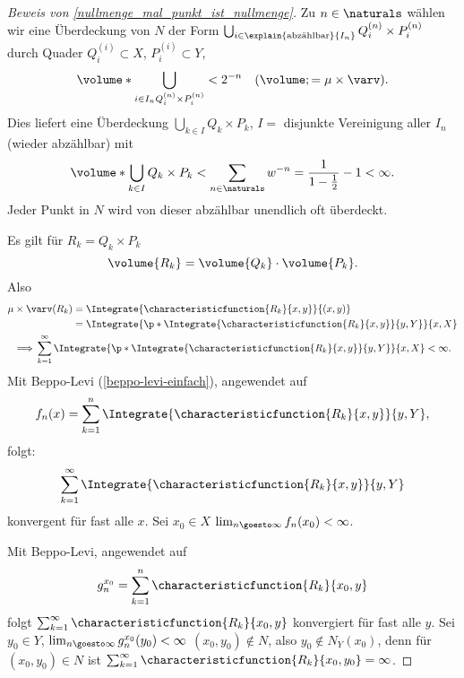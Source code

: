 \begin{proof}[Beweis von \ref{nullmenge_mal_punkt_ist_nullmenge}]
  Zu \( n\in \naturals \) wählen wir eine Überdeckung von \( N \) der Form \( \bigcup_{i\in \explain{\text{abzählbar}}{I_n}}Q_i^{(n)}\times P_i^{(n)} \) durch Quader \( Q_i^{(i)}\subset X \), \( P_i^{(i)}\subset Y \),
  \begin{equation*}
    \volume*{\bigcup_{i\in I_n Q_i^{(n)}\times P_i^{(n)}}}<2^{-n}\quad (\volume;=\mu\times \varv).
  \end{equation*}
  Dies liefert eine Überdeckung \( \bigcup_{k\in I}Q_k\times P_k \), \( I =  \) disjunkte Vereinigung aller \( I_n \) (wieder abzählbar) mit 
  \begin{equation*}
    \volume*{\bigcup_{k\in I}Q_k\times P_k}<\sum_{n\in \naturals} w^{-n}=\frac{1}{1-\frac{1}{2}}-1<\infty.
  \end{equation*}
  Jeder Punkt in \( N \) wird von dieser abzählbar unendlich oft überdeckt.

  Es gilt für \( R_k=Q_k\times P_k \)
  \begin{equation*}
    \volume{R_k}=\volume{Q_k}\cdot \volume{P_k}.
  \end{equation*}
  Also
  \begin{align*}
    \mu\times \varv(R_k)&=\Integrate{\characteristicfunction{R_k}{x,y}}{{(x,y)}}\\
    &=\Integrate{\p*{\Integrate{\characteristicfunction{R_k}{x,y}}{y,Y}}}{x,X}\\
    \implies \span \sum_{k=1}^{\infty}\Integrate{\p*{\Integrate{\characteristicfunction{R_k}{x,y}}{y,Y}}}{x,X}<\infty.
  \end{align*}
  Mit Beppo-Levi (\ref{beppo-levi-einfach}), angewendet auf
  \begin{equation*}
    f_n(x)=\sum_{k=1}^{n}\Integrate{\characteristicfunction{R_k}{x,y}}{y,Y},
  \end{equation*}
  folgt:
  \begin{equation}
    \sum_{k=1}^{\infty}\Integrate{\characteristicfunction{R_k}{x,y}}{y,Y} 
  \end{equation}
  konvergent für fast alle \( x \). Sei \( x_0\in X \) \sd \( \lim_{n \goesto \infty}f_n(x_0)<\infty \).

  Mit Beppo-Levi, angewendet auf
  \begin{equation*}
    g_n^{x_0}=\sum_{k=1}^{n}\characteristicfunction{R_k}{x_0,y}
  \end{equation*}
  folgt \( \sum_{k=1}^{\infty}\characteristicfunction{R_k}{x_0,y} \)
  konvergiert für fast alle \( y \).
  Sei \( y_0\in Y \), \sd  \( \lim_{n \goesto \infty}g_n^{x_0}(y_0)<\infty \) 
  \timplies \( (x_0,y_0)\not\in N \), 
  also \( y_0\not\in N_Y(x_0) \), 
  denn für \( (x_0,y_0)\in N \) ist \( \sum_{k=1}^{\infty}\characteristicfunction{R_k}{x_0,y_0}=\infty \).
\end{proof}
